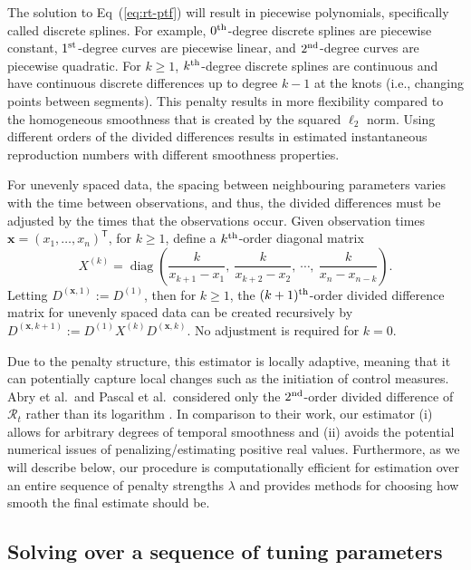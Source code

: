 \documentclass[10pt,letterpaper]{article}
\newcommand{\lr}[1]{\left(#1\right)}
\DeclareMathOperator*{\diag}{diag}
\def\bfx{\mathbf{x}}
\def\calR{\mathcal{R}}
\renewcommand{\top}{\mathsf{T}}
\def\th{^{\textnormal{th}}}
\def\first{$1^{\textnormal{st}}$}
\def\second{$2^{\textnormal{nd}}$}
\renewcommand{\eqref}[1]{Eq~(\ref{#1})}
\begin{document}
The solution to \eqref{eq:rt-ptf} will result in piecewise
polynomials, specifically called discrete splines. For example, $0\th$-degree
discrete splines are piecewise constant, \first-degree curves are piecewise
linear, and \second-degree curves are piecewise quadratic. For $k\geq 1$,
$k\th$-degree discrete splines are continuous and have continuous discrete
differences up to degree $k-1$ at the knots (i.e., changing points between segments). This penalty results in more
flexibility compared to the homogeneous smoothness that is created by the
squared $\ell_2$ norm. Using different orders of the divided differences results in
estimated instantaneous reproduction numbers with different smoothness properties. 



For unevenly spaced data, the spacing between neighbouring parameters
varies with the time between observations, and thus, the divided differences
must be adjusted by the times that the observations occur. Given observation
times $\bfx = {(x_1,\dots,x_n)}^\top$, for $k \geq 1$, define a $k\th$-order
diagonal matrix 
\begin{equation}
  X^{(k)} = \diag \lr{\frac{k}{x_{k+1} - x_1},\ \frac{k}{x_{k+2} - x_2},\ 
  \cdots,\ \frac{k}{x_n - x_{n-k}} }.
\end{equation}
Letting $D^{(\bfx,1)} := D^{(1)}$,
then for $k\geq 1$, the $(k+1)\th$-order divided difference matrix for unevenly
spaced data can be created recursively by
$D^{(\bfx, k+1)} := D^{(1)} X^{(k)} D^{(\bfx,k)}.$ No adjustment is required
for $k=0$. 


Due to the penalty structure, this estimator is locally adaptive,
meaning that it can potentially capture local changes such as the initiation of
control measures. Abry et al.\ and Pascal et al.\ considered only the
\second-order divided difference of $\calR_t$ rather than its logarithm 
\cite{abry2020spatial,pascal2022nonsmooth}. In
comparison to their work, our estimator (i) allows for arbitrary degrees of
temporal smoothness and (ii) avoids the potential numerical issues of
penalizing/estimating positive real values. Furthermore, as we will describe
below, our procedure is computationally efficient for estimation over an entire
sequence of penalty strengths $\lambda$ and provides methods for choosing how
smooth the final estimate should be.


\subsection{Solving over a sequence of tuning parameters}
\label{sec:candidate-set}
\end{document}
